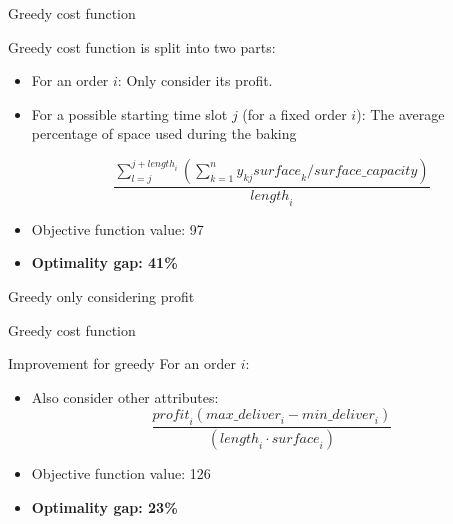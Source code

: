 \documentclass[presentation]{beamer}
\begin{document}
\begin{frame}{Greedy cost function}
\begin{block}{Greedy cost function is split into two parts:}
    
\begin{itemize}
    \item For an order $i$:
         Only consider its profit.

    \item For a possible starting time slot $j$ (for a fixed order $i$): 
        The average percentage of space used during the baking
        \begin{center}
            $$\frac{\sum_{l=j}^{j + \mathit{length}_i} (\sum_{k=1}^n y_{kj} \mathit{surface}_k / \mathit{surface\_capacity})}{\mathit{length}_i}$$
        \end{center}
    \end{itemize}
    \end{block}
    \begin{itemize}
            \item Objective function value: 97
    \item \textbf{Optimality gap: 41\%}
    \end{itemize}
    \end{frame}

\begin{frame}{Greedy only considering profit}
\begin{figure}[H]
\centering


\end{figure}  
\end{frame}
    
\begin{frame}{Greedy cost function}
\begin{block}{Improvement for greedy}
For an order $i$:
        \begin{itemize}
            \item Also consider other attributes:
            $$\frac{\mathit{profit}_i (\mathit{max\_deliver}_i - \mathit{min\_deliver}_i)}{(\mathit{length}_i \cdot \mathit{surface}_i)}$$
        \end{itemize}
\end{block}

\begin{itemize}
        \item Objective function value: 126 
        \item \textbf{Optimality gap: 23\%} 
        \end{itemize}
\end{frame}
\end{document}
